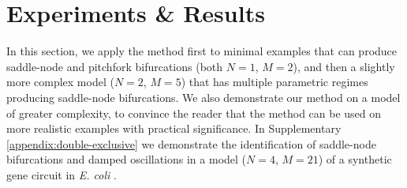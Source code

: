 \documentclass{article}
\begin{document}
\section{Experiments \& Results}
\label{section:results}
In this section, we apply the method first to minimal examples that can produce saddle-node and pitchfork bifurcations (both $N=1$, $M=2$), and then a slightly more complex model ($N=2$, $M=5$) that has multiple parametric regimes producing saddle-node bifurcations. We also demonstrate our method on a model of greater complexity, to convince the reader that the method can be used on more realistic examples with practical significance. In Supplementary \ref{appendix:double-exclusive} we demonstrate the identification of saddle-node bifurcations and damped oscillations in a model ($N=4$, $M=21$) of a synthetic gene circuit in \emph{E. coli} \cite{Grant2020InterpretationCircuit}.
\end{document}
